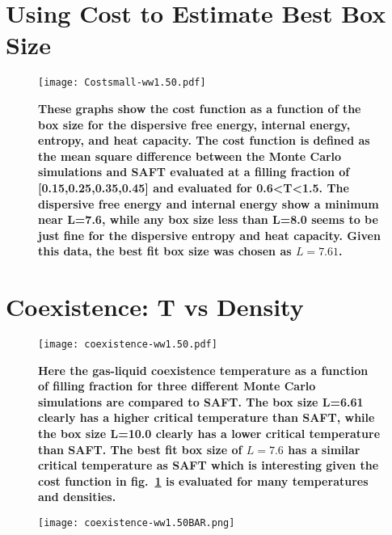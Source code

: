 \pagebreak
\section{Using Cost to Estimate Best Box Size}
\begin{figure}[h]
\vspace*{-10mm}
\hspace*{-6mm}
	\centering
	\texttt{[image: Costsmall-ww1.50.pdf]}
	\caption{\scriptsize\textbf{
	These graphs show the cost function as a function of the box size for the dispersive free energy, internal energy, entropy, and heat capacity. The cost function is defined as the mean square difference between the Monte Carlo simulations and SAFT evaluated at a filling fraction of [0.15,0.25,0.35,0.45] and evaluated for 0.6\textless T\textless 1.5. The dispersive free energy and internal energy show a minimum near L=7.6, while any box size less than L=8.0 seems to be just fine for the dispersive entropy and heat capacity. Given this data, the best fit box size was chosen as $L=7.61$.}}
	\label{fig:Cost}
\end{figure}
\section{Coexistence: T vs Density}
\begin{figure}[h]
\vspace*{-10mm}
\hspace*{-6mm}
	\centering
	\texttt{[image: coexistence-ww1.50.pdf]}
	\caption{\scriptsize\textbf{
	Here the gas-liquid coexistence temperature as a function of filling fraction for three different Monte Carlo simulations are compared to SAFT. The box size L=6.61 clearly has a higher critical temperature than SAFT, while the box size L=10.0 clearly has a lower critical temperature than SAFT. The best fit box size of $L=7.6$ has a similar critical temperature as SAFT which is interesting given the cost function in fig.~\ref{fig:Cost} is evaluated for many temperatures and densities.}}
	\label{fig:Coexistence}
\end{figure}

\begin{figure}[h!]
\vspace*{-64.5mm}
\hspace*{-110mm}
	\centering
	\texttt{[image: coexistence-ww1.50BAR.png]}
\end{figure}



